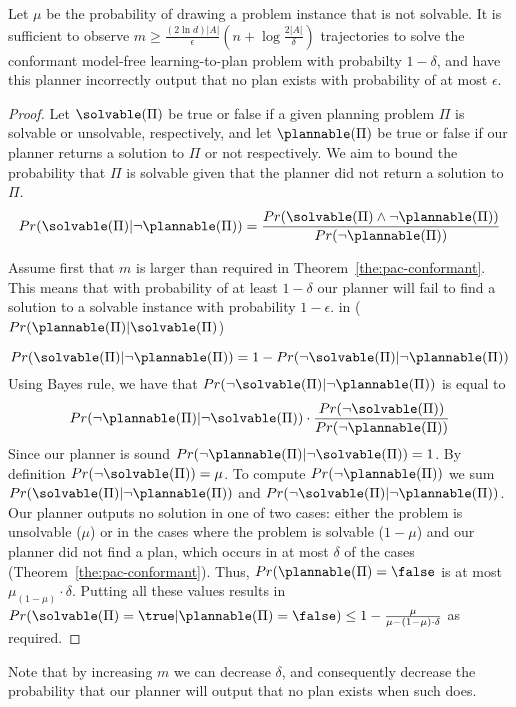 \begin{corollary}
	Let $\mu$ be the probability of drawing a problem instance that is not solvable. 
	It is sufficient to observe $m\geq\frac{(2\ln  d)|A|}{\epsilon}(n+\log\frac{2|A|}{\delta})$
	trajectories to solve the conformant model-free learning-to-plan problem with probabilty $1-\delta$, and have this planner incorrectly output that no plan exists with probability of at most $\epsilon$. 
\end{corollary}
\begin{proof}
	Let $\solvable(\Pi)$ be true or false if  a given planning problem $\Pi$ is solvable or unsolvable, respectively, 
	and let $\plannable(\Pi)$ be true or false if our planner returns a solution to $\Pi$ or not respectively. We aim to bound the probability that $\Pi$ is solvable given that the planner did not return a solution to $\Pi$. 
	\[  Pr(\solvable(\Pi)|\neg\plannable(\Pi))
	=\frac{Pr(\solvable(\Pi)\wedge \neg\plannable(\Pi))}{Pr(\neg\plannable(\Pi))}\]
	
	Assume first that $m$ is larger than required in Theorem~\ref{the:pac-conformant}. This means that
	with probability of at least $1-\delta$ our planner will fail to find a solution to a solvable instance with probability $1-\epsilon$. in  ($Pr(\plannable(\Pi)|\solvable(\Pi)$) 
	
	\[  Pr(\solvable(\Pi)|\neg\plannable(\Pi))
	=1-Pr(\neg \solvable(\Pi)|\neg\plannable(\Pi)) \]
	Using Bayes rule, we have that $Pr(\neg\solvable(\Pi)|\neg\plannable(\Pi))$ is equal to 
	\[ 	Pr(\neg\plannable(\Pi)|\neg\solvable(\Pi))\cdot \frac{Pr(\neg\solvable(\Pi))}{Pr(\neg\plannable(\Pi))} \]
	Since our planner is sound $Pr(\neg\plannable(\Pi)|\neg\solvable(\Pi))=1$. 
	By definition $Pr(\neg\solvable(\Pi))=\mu$. 
	To compute $Pr(\neg\plannable(\Pi))$ we sum 
	$Pr(\solvable(\Pi)|\neg\plannable(\Pi))$ and
	$Pr(\neg\solvable(\Pi)|\neg\plannable(\Pi))$.
	Our planner outputs no solution in one of two cases: either the problem is unsolvable ($\mu$) or in the cases where 
	the problem is solvable ($1-\mu$) and our planner did not find a plan, which occurs 
	in at most $\delta$ of the cases (Theorem~\ref{the:pac-conformant}). Thus, $Pr(\plannable(\Pi)=\false$ is at most $\mu_(1-\mu)\cdot \delta$. Putting all these values 
	results in 
	$Pr(\solvable(\Pi)=\true|\plannable(\Pi)=\false)\leq 1-\frac{\mu}{\mu-(1-\mu)\cdot\delta}$ as required.
\end{proof}
Note that by increasing $m$ we can decrease $\delta$, and consequently decrease the probability
that our planner will output that no plan exists when such does. 

